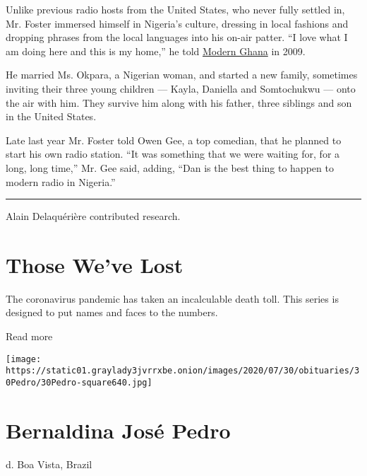 Unlike previous radio hosts from the United States, who never fully
settled in, Mr. Foster immersed himself in Nigeria's culture, dressing
in local fashions and dropping phrases from the local languages into his
on-air patter. ``I love what I am doing here and this is my home,'' he
told
\href{https://www.modernghana.com/movie/4751/3/i-left-cool-fm-because-i-wanted-to-grow-dan-foster.html}{Modern
Ghana} in 2009.

He married Ms. Okpara, a Nigerian woman, and started a new family,
sometimes inviting their three young children --- Kayla, Daniella and
Somtochukwu --- onto the air with him. They survive him along with his
father, three siblings and son in the United States.

Late last year Mr. Foster told Owen Gee, a top comedian, that he planned
to start his own radio station. ``It was something that we were waiting
for, for a long, long time,'' Mr. Gee said, adding, ``Dan is the best
thing to happen to modern radio in Nigeria.''

\begin{center}\rule{0.5\linewidth}{\linethickness}\end{center}

Alain Delaquérière contributed research.

\href{https://www.nytimes3xbfgragh.onion/interactive/2020/obituaries/people-died-coronavirus-obituaries.html?action=click\&pgtype=Article\&state=default\&region=BELOW_MAIN_CONTENT\&context=covid_obits_promo}{}

\hypertarget{those-weve-lost}{%
\section{Those We've Lost}\label{those-weve-lost}}

The coronavirus pandemic has taken an incalculable death toll. This
series is designed to put names and faces to the numbers.

Read more

\texttt{[image: https://static01.graylady3jvrrxbe.onion/images/2020/07/30/obituaries/30Pedro/30Pedro-square640.jpg]}

\hypertarget{bernaldina-josuxe9-pedro}{%
\section{Bernaldina José Pedro}\label{bernaldina-josuxe9-pedro}}

d. Boa Vista, Brazil

